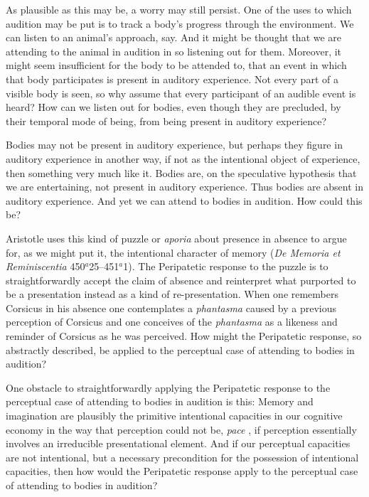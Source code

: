 As plausible as this may be, a worry may still persist. One of the uses to which audition may be put is to track a body's progress through the environment. We can listen to an animal's approach, say. And it might be thought that we are attending to the animal in audition in so listening out for them. Moreover, it might seem insufficient for the body to be attended to, that an event in which that body participates is present in auditory experience. Not every part of a visible body is seen, so why assume that every participant of an audible event is heard? How can we listen out for bodies, even though they are precluded, by their temporal mode of being, from being present in auditory experience? 

Bodies may not be present in auditory experience, but perhaps they figure in auditory experience in another way, if not as the intentional object of experience, then something very much like it. Bodies are, on the speculative hypothesis that we are entertaining, not present in auditory experience. Thus bodies are absent in auditory experience. And yet we can attend to bodies in audition. How could this be? 

Aristotle uses this kind of puzzle or \emph{aporia} about presence in absence to argue for, as we might put it, the intentional character of memory (\emph{De Memoria et Reminiscentia} 450\( ^{a} \)25--451\( ^{a} \)1). The Peripatetic response to the puzzle is to straightforwardly accept the claim of absence and reinterpret what purported to be a presentation instead as a kind of re-presentation. When one remembers Corsicus in his absence one contemplates a \emph{phantasma} caused by a previous perception of Corsicus and one conceives of the \emph{phantasma} as a likeness and reminder of Corsicus as he was perceived. How might the Peripatetic response, so abstractly described, be applied to the perceptual case of attending to bodies in audition? 

One obstacle to straightforwardly applying the Peripatetic response to the perceptual case of attending to bodies in audition is this: Memory and imagination are plausibly the primitive intentional capacities in our cognitive economy in the way that perception could not be, \emph{pace} \citet{Burge:2010uq}, if perception essentially involves an irreducible presentational element. And if our perceptual capacities are not intentional, but a necessary precondition for the possession of intentional capacities, then how would the Peripatetic response apply to the perceptual case of attending to bodies in audition?

